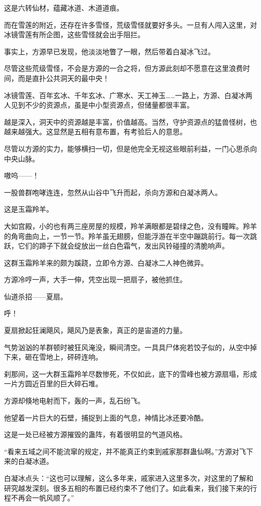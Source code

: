 \begin{this_body}
这是六转仙材，蕴藏冰道、木道道痕。

而在雪莲的附近，还存在许多雪怪，荒级雪怪就要好多头。一旦有人闯入这里，对冰镜雪莲有所企图，这些雪怪就会出手阻拦。

事实上，方源早已发现，他淡淡地瞥了一眼，然后带着白凝冰飞过。

尽管这些荒级雪怪，不会是方源的一合之将，但方源此刻却不愿意在这里浪费时间，而是直扑公共洞天的最中央！

冰镜雪莲、百年玄冰、千年玄冰、广寒水、天工神玉……一路上，方源、白凝冰两人见到不少的资源点，虽是中小型资源点，但储量都很丰富。

越是深入，洞天中的资源越是丰富，价值越高。当然，守护资源点的猛兽怪树，也越来越强大。这显然是五相有意布置，有考验后人的意思。

尽管以方源的实力，能够横扫一切，但是他完全无视这些眼前利益，一门心思杀向中央山脉。

嗷呜——！

一股兽群咆哮连连，忽然从山谷中飞升而起，杀向方源和白凝冰两人。

这是玉霜羚羊。

大如宫殿，小的也有两三座房屋的规模，羚羊满眼都是碧绿之色，没有瞳眸。羚羊的角弯曲向上，一节一节。羚羊虽无翅膀，但能浮游在半空中蹦跳前行。每一次跳跃，它们的蹄子下就会绽放出一丝白色霜气，发出风铃碰撞的清脆响声。

这群玉霜羚羊来的颇为蹊跷，立即令方源、白凝冰二人神色微异。

方源冷哼一声，大手一伸，凭空出现一把扇子，被他抓住。

仙道杀招——夏扇。

呼！

夏扇掀起狂澜飓风，飓风乃是表象，真正的是宙道的力量。

气势汹汹的羊群顿时被狂风淹没，瞬间清空。一具具尸体宛若饺子似的，从空中掉下来，砸在雪地上，砰砰连响。

刹那间，这一大群玉霜羚羊尽数惨死，不仅如此，底下的雪峰也被方源扇塌，形成一片方圆近百里的巨大碎石堆。

方源却倏地电射而下，轰的一声，乱石纷飞。

他望着一片巨大的石壁，捕捉到上面的气息，神情比冰还要冷酷。

这是一处已经被方源摧毁的蛊阵，有着很明显的气道风格。

“看来五域之间不能流窜的规定，并不能真正约束到戚家那群蛊仙啊。”方源对飞下来的白凝冰道。

白凝冰点头：“这也可以理解，这么多年来，戚家进入这里多次，对这里的了解和研究越发深刻。很多五相的布置已经约束不了他们了。如此看来，我们接下来的行程不再会一帆风顺了。”


\end{this_body}
